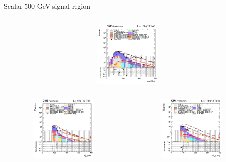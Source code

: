 \documentclass[8pt]{beamer}
\begin{document}
\begin{frame}{Scalar 500 GeV signal region}
\begin{columns}
\begin{column}{0.33\textwidth}
\begin{center}
			\vspace{-8pt}
			\begin{block}{}\end{block}\vspace{10pt}
     			\includegraphics[width=1.0\textwidth, height=90pt]{figs/2018/log_cratio_topCR_ll_DNN_signal0_scalar500_METcorrected_pt.png}
    		\end{center}		
		\end{column}
\end{columns}
\begin{columns}
		\begin{column}{0.33\textwidth}
			\begin{center}
     			\includegraphics[width=1.0\textwidth, height=90pt]{figs/2016/log_cratio_topCR_ll_DNN_signal0_scalar500_mt2ll.png}
    		\end{center}		
		\end{column}
		\begin{column}{0.33\textwidth}
			\begin{center}
     			\includegraphics[width=1.0\textwidth, height=90pt]{figs/2017/log_cratio_topCR_ll_DNN_signal0_scalar500_mt2ll.png}
    		\end{center}		
		\end{column}

\end{columns}
\end{frame}
\end{document}
